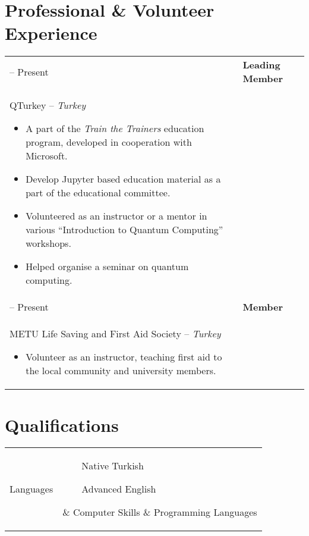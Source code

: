 \documentclass[11pt]{article} %
\makeatletter
\newlength{\firstColumnWidth}
\newlength{\tabusep}
\newlength{\secondColumnWidth}
\newcommand{\tabitem}{~~\llap{--}~~}
\newcommand{\threeecols}[2]{\parbox{
    0.98\secondColumnWidth}{\hfill
    \parbox[t]{0.465\secondColumnWidth}{#1}
    \parbox[t]{0.465\secondColumnWidth}{#2}
    }
}
\newenvironment{twocols}
    {
    \begin{longtable}[h]{%
        @{}%
        >{\raggedleft}p{\firstColumnWidth}%
        @{\hspace{\tabusep}}%
        >{\arraybackslash\raggedright}p{\dimexpr %
            \linewidth-\firstColumnWidth-\tabusep%
        \relax}%
        @{}%
        }
    } {
        \end{longtable}
    }
\makeatother
\begin{document}
\section{Professional \& Volunteer Experience}
\begin{twocols}
    2019 -- Present & %
        \textbf{Leading Member} \\
        QTurkey -- \textit{Turkey}
        \begin{itemize}
            \item A part of the \emph{Train the Trainers} education program, developed in cooperation with Microsoft.
            \item Develop Jupyter based education material as a part of the educational committee.
            \item Volunteered as an instructor or a mentor in various “Introduction to Quantum Computing” workshops.
            \item Helped organise a seminar on quantum computing.
        \end{itemize} \tabularnewline
    2018 -- Present & %
        \textbf{Member} \\ 
        METU Life Saving and First Aid Society -- \textit{Turkey}
        \begin{itemize}
            \item Volunteer as an instructor, teaching first aid to the local community and university members.
        \end{itemize}
\end{twocols}

\section{Qualifications}

\begin{twocols}
    Languages & \threeecols{\tabitem Native Turkish}{
    \tabitem Advanced English} \tabularnewline & \tabularnewline
    Computer Skills & %
        Programming Languages\\[.5em]
        \threeecols
            {\tabitem C/C++ \par \tabitem Q\# \par \tabitem \LaTeX}
            {\tabitem Python \par \tabitem Swift \par \tabitem Haskell}\\[.7em]
        Technologies/Frameworks\\[.3em]
        \threeecols {\tabitem git and Github}{\tabitem Qiskit}
\end{twocols}
\end{document}
